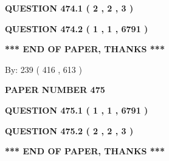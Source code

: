 \documentclass[12pt]{article}
\begin{document}
\vspace{0.2in}
  
{\textbf{\Large{QUESTION
474.1 
 ( 2 , 2 , 3 )
}}}
  
  
  
\vspace{0.2in}
  
{\textbf{\Large{QUESTION
474.2 
 ( 1 , 1 , 6791 )
}}}
  
  
   
   
 \vspace{0.2in}
 
   
   
   
   
\vspace{1.0in} 
{\textbf{\large{ *** END OF PAPER, THANKS *** }}} 
   
   
\hspace{1.0in} By: 
 239 ( 416 ,  613 )
   
   
   
   
\newpage 
\setcounter{page}{ 
   475001 } 
   
   
   
   
 {\textbf{ \Large{ PAPER NUMBER  475  }}}
   
   
\vspace{0.2in}
   
   
   
   
   
   
 \vspace{0.2in}
 
 
 
 
   
   
  
\vspace{0.2in}
  
{\textbf{\Large{QUESTION
475.1 
 ( 1 , 1 , 6791 )
}}}
  
  
  
\vspace{0.2in}
  
{\textbf{\Large{QUESTION
475.2 
 ( 2 , 2 , 3 )
}}}
  
  
   
   
 \vspace{0.2in}
 
   
   
   
   
\vspace{1.0in} 
{\textbf{\large{ *** END OF PAPER, THANKS *** }}} 
   
\end{document}
